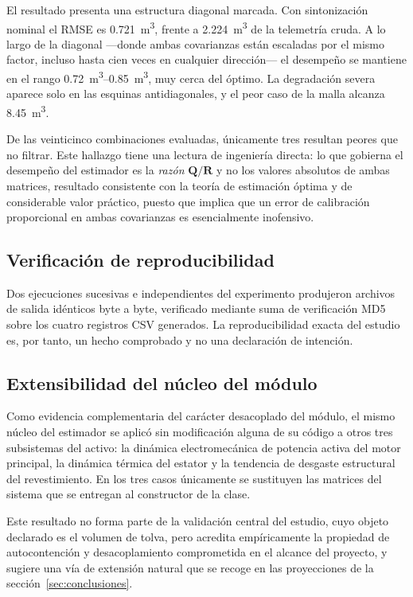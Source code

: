 El resultado presenta una estructura diagonal marcada. Con sintonización nominal
el RMSE es \SI{0,721}{\metre\cubed}, frente a \SI{2,224}{\metre\cubed} de la
telemetría cruda. A lo largo de la diagonal —donde ambas covarianzas están
escaladas por el mismo factor, incluso hasta cien veces en cualquier dirección—
el desempeño se mantiene en el rango \SIrange{0,72}{0,85}{\metre\cubed}, muy
cerca del óptimo. La degradación severa aparece solo en las esquinas
antidiagonales, y el peor caso de la malla alcanza \SI{8,45}{\metre\cubed}.

De las veinticinco combinaciones evaluadas, únicamente tres resultan peores que
no filtrar. Este hallazgo tiene una lectura de ingeniería directa: lo que
gobierna el desempeño del estimador es la \emph{razón} $\mathbf{Q}/\mathbf{R}$ y
no los valores absolutos de ambas matrices, resultado consistente con la teoría
de estimación óptima y de considerable valor práctico, puesto que implica que un
error de calibración proporcional en ambas covarianzas es esencialmente
inofensivo.

\subsection{Verificación de reproducibilidad}

Dos ejecuciones sucesivas e independientes del experimento produjeron archivos
de salida idénticos byte a byte, verificado mediante suma de verificación MD5
sobre los cuatro registros CSV generados. La reproducibilidad exacta del estudio
es, por tanto, un hecho comprobado y no una declaración de intención.

\subsection{Extensibilidad del núcleo del módulo}
\label{sec:extensibilidad}

Como evidencia complementaria del carácter desacoplado del módulo, el mismo
núcleo del estimador se aplicó sin modificación alguna de su código a otros tres
subsistemas del activo: la dinámica electromecánica de potencia activa del motor
principal, la dinámica térmica del estator y la tendencia de desgaste
estructural del revestimiento. En los tres casos únicamente se sustituyen las
matrices del sistema que se entregan al constructor de la clase.

Este resultado no forma parte de la validación central del estudio, cuyo objeto
declarado es el volumen de tolva, pero acredita empíricamente la propiedad de
autocontención y desacoplamiento comprometida en el alcance del proyecto, y
sugiere una vía de extensión natural que se recoge en las proyecciones de la
sección~\ref{sec:conclusiones}.
